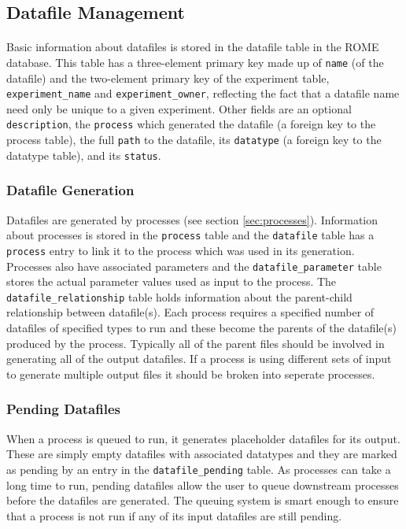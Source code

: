 \subsection{Datafile Management}
\label{sec:datafile_management}

\paragraph{}
Basic information about datafiles is stored in the datafile table in the ROME database. This table has a three-element primary key made up of \texttt{name} (of the datafile) and the two-element primary key of the experiment table, \texttt{experiment\_name} and \texttt{experiment\_owner}, reflecting the fact that a datafile name need only be unique to a given experiment. Other fields are an optional \texttt{description}, the \texttt{process} which generated the datafile (a foreign key to the process table), the full \texttt{path} to the datafile, its \texttt{datatype} (a foreign key to the datatype table), and its \texttt{status}. 

\subsubsection{Datafile Generation}
Datafiles are generated by processes (see section \ref{sec:processes}). Information about processes is stored in the \texttt{process} table and the \texttt{datafile} table has a \texttt{process} entry to link it to the process which was used in its generation. Processes also have associated parameters and the \texttt{datafile\_parameter} table stores the actual parameter values used as input to the process. The \texttt{datafile\_relationship} table holds information about the parent-child relationship between datafile(s). Each process requires a specified number of datafiles of specified types to run and these become the parents of the datafile(s) produced by the process. Typically all of the parent files should be involved in generating all of the  output datafiles. If a process is using different sets of input to generate multiple output files it should be broken into seperate processes.

\subsubsection{Pending Datafiles}
When a process is queued to run, it generates placeholder datafiles for its output. These are simply empty datafiles with associated datatypes and they are marked as pending by an entry in the \texttt{datafile\_pending} table. As processes can take a long time to run, pending datafiles allow the user to queue downstream processes before the datafiles are generated. The queuing system is smart enough to ensure that a process is not run if any of its input datafiles are still pending.

